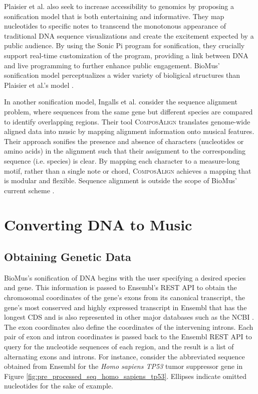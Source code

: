 \documentclass[letterpaper]{article}
\begin{document}
Plaisier et al. also seek to increase accessibility to genomics by proposing a sonification model that is both entertaining and informative. They map nucleotides to specific notes to transcend the monotonous appearance of traditional DNA sequence visualizations and create the excitement expected by a public audience. By using the Sonic Pi program for sonification, they crucially support real-time customization of the program, providing a link between DNA and live programming to further enhance public engagement. BioMus’ sonification model perceptualizes a wider variety of bioligical structures than Plaisier et al.’s model \cite{plaisier_meagher_barker_2021}.

In another sonification model, Ingalls et al. consider the sequence alignment problem, where sequences from the same gene but different species are compared to identify overlapping regions. Their tool \textsc{ComposAlign} translates genome-wide aligned data into music by mapping alignment information onto musical features. Their approach sonifies the presence and absence of characters (nucleotides or amino acids) in the alignment such that their assignment to the corresponding sequence (i.e. species) is clear. By mapping each character to a measure-long motif, rather than a single note or chord, \textsc{ComposAlign} achieves a mapping that is modular and flexible. Sequence alignment is outside the scope of BioMus’ current scheme \cite{mci/Ingalls2009}. 

\section{Converting DNA to Music}
\subsection{Obtaining Genetic Data}
BioMus’s sonification of DNA begins with the user specifying a desired species and gene. This information is passed to Ensembl’s REST API to obtain the chromosomal coordinates of the gene’s exons from its canonical transcript, the gene’s most conserved and highly expressed transcript in Ensembl that has the longest CDS and is also represented in other major databases such as the NCBI \cite{ensembl_transcript_flags}. The exon coordinates also define the coordinates of the intervening introns. Each pair of exon and intron coordinates is passed back to the Ensembl REST API to query for the nucleotide sequences of each region, and the result is a list of alternating exons and introns. For instance, consider the abbreviated sequence obtained from Ensembl for the \textit{Homo sapiens TP53} tumor suppressor gene in Figure \ref{fig:pre_processed_seq_homo_sapiens_tp53}. Ellipses indicate omitted nucleotides for the sake of example.
\end{document}
